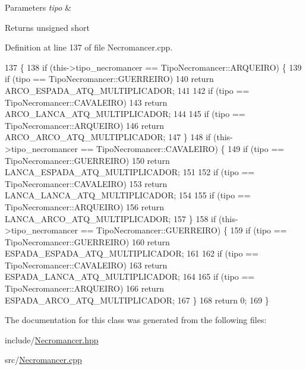 \begin{DoxyParams}{Parameters}
{\em tipo} & \\
\hline
\end{DoxyParams}
\begin{DoxyReturn}{Returns}
unsigned short 
\end{DoxyReturn}


Definition at line 137 of file Necromancer.\+cpp.


\begin{DoxyCode}
137                                                               \{
138     \textcolor{keywordflow}{if} (this->tipo\_necromancer == TipoNecromancer::ARQUEIRO) \{
139         \textcolor{keywordflow}{if} (tipo == TipoNecromancer::GUERREIRO)
140             \textcolor{keywordflow}{return} ARCO\_ESPADA\_ATQ\_MULTIPLICADOR;
141 
142         \textcolor{keywordflow}{if} (tipo == TipoNecromancer::CAVALEIRO)
143             \textcolor{keywordflow}{return} ARCO\_LANCA\_ATQ\_MULTIPLICADOR;
144 
145         \textcolor{keywordflow}{if} (tipo == TipoNecromancer::ARQUEIRO)
146             \textcolor{keywordflow}{return} ARCO\_ARCO\_ATQ\_MULTIPLICADOR;
147     \}
148     \textcolor{keywordflow}{if} (this->tipo\_necromancer == TipoNecromancer::CAVALEIRO) \{
149         \textcolor{keywordflow}{if} (tipo == TipoNecromancer::GUERREIRO)
150             \textcolor{keywordflow}{return} LANCA\_ESPADA\_ATQ\_MULTIPLICADOR;
151 
152         \textcolor{keywordflow}{if} (tipo == TipoNecromancer::CAVALEIRO)
153             \textcolor{keywordflow}{return} LANCA\_LANCA\_ATQ\_MULTIPLICADOR;
154 
155         \textcolor{keywordflow}{if} (tipo == TipoNecromancer::ARQUEIRO)
156             \textcolor{keywordflow}{return} LANCA\_ARCO\_ATQ\_MULTIPLICADOR;
157     \}
158     \textcolor{keywordflow}{if} (this->tipo\_necromancer == TipoNecromancer::GUERREIRO) \{
159         \textcolor{keywordflow}{if} (tipo == TipoNecromancer::GUERREIRO)
160             \textcolor{keywordflow}{return} ESPADA\_ESPADA\_ATQ\_MULTIPLICADOR;
161 
162         \textcolor{keywordflow}{if} (tipo == TipoNecromancer::CAVALEIRO)
163             \textcolor{keywordflow}{return} ESPADA\_LANCA\_ATQ\_MULTIPLICADOR;
164 
165         \textcolor{keywordflow}{if} (tipo == TipoNecromancer::ARQUEIRO)
166             \textcolor{keywordflow}{return} ESPADA\_ARCO\_ATQ\_MULTIPLICADOR;
167     \}
168     \textcolor{keywordflow}{return} 0;
169 \}
\end{DoxyCode}


The documentation for this class was generated from the following files\+:\begin{DoxyCompactItemize}
\item 
include/\mbox{\hyperlink{_necromancer_8hpp}{Necromancer.\+hpp}}\item 
src/\mbox{\hyperlink{_necromancer_8cpp}{Necromancer.\+cpp}}\end{DoxyCompactItemize}
